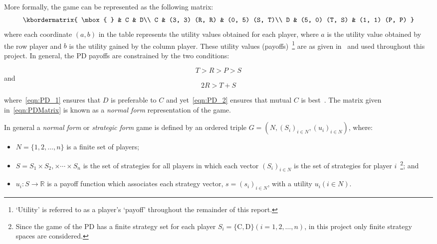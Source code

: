 More formally, the game can be represented as the following matrix:
\begin{equation}
    \kbordermatrix{
        \mbox{ } & C & D\\ 
        C & (3, 3) (R, R) & (0, 5) (S, T)\\ 
        D & (5, 0) (T, S) & (1, 1) (P, P)
    }
\end{equation}\label{eqn:PDMatrix}
where each coordinate \((a, b)\) in the table represents the utility values
obtained for each player, where \(a\) is the utility value obtained by the row
player and \(b\) is the utility gained by the column player. These utility
values (payoffs)~\footnote{`Utility' is referred to as a player's `payoff'
throughout the remainder of this report.} are as given
in~\cite{axelrod1980effective} and
used throughout this project. In general, the PD payoffs are constrained by the
two conditions:

\begin{equation}
    T > R > P > S
\end{equation}\label{eqn:PD_1}
and
\begin{equation}
    2R > T + S
\end{equation}\label{eqn:PD_2}

where~\eqref{eqn:PD_1} ensures that \(D\) is preferable to \(C\) and
yet~\eqref{eqn:PD_2} ensures that mutual \(C\) is
best~\cite{Knight2019,Press2012}. The matrix given in~\eqref{eqn:PDMatrix} is
known as a \textit{normal form} representation of the game.

\begin{definition}
    In general a \textit{normal form} or \textit{strategic form} game is defined
    by an ordered triple \(G = (N, {(S_i)}_{i \in N}, {(u_i)}_{i \in N})\), where:
    \begin{itemize}
        \item \(N = \{1, 2,\ldots, n\} \) is a finite set of players;
        \item \(S = S_1 \times S_2, \times \cdots \times S_n\) is the set of
        strategies for all players in which each vector \({(S_i)}_{i \in N}\) is
        the set of strategies for player \(i\)~\footnote{Since the game of the PD has a finite strategy set for each player \(S_i=\{\text{C},
        \text{D}\} (i = 1, 2, \ldots, n)\), in this project only finite
        strategy spaces are considered.}; and
        \item \(u_i : S \to \mathbb{R}\) is a payoff function which associates each
        strategy vector, \(s = {(s_i)}_{i \in N}\), with a utility
        \(u_i(i \in N)\).
    \end{itemize}
\end{definition}

